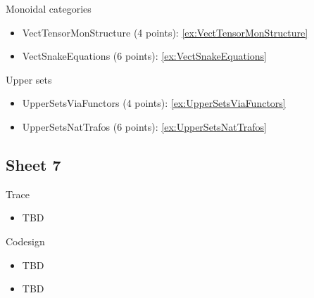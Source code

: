 Monoidal categories
\begin{itemize} 
\item VectTensorMonStructure (4 points): \cref{ex:VectTensorMonStructure}
\item VectSnakeEquations (6 points): \cref{ex:VectSnakeEquations}
\end{itemize}

Upper sets
\begin{itemize}
\item UpperSetsViaFunctors (4 points): \cref{ex:UpperSetsViaFunctors}
\item UpperSetsNatTrafos (6 points): \cref{ex:UpperSetsNatTrafos}
\end{itemize}


\subsection{Sheet 7}

Trace
\begin{itemize}
\item TBD
\end{itemize}

Codesign
\begin{itemize} 
\item TBD
\item TBD
\end{itemize}

